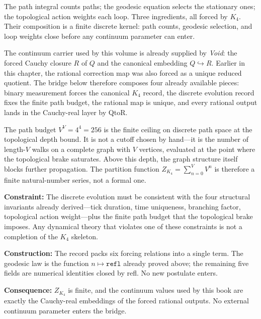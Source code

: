 \documentclass[11pt,a4paper]{book}
\def\mathbb#1{#1}%
\def\texttt#1{#1}%
\def\ensuremath#1{#1}%
\begin{document}
The path integral counts paths; the geodesic equation selects the stationary ones; the topological action weights each loop. Three ingredients, all forced by $K_4$. Their composition is a finite discrete kernel: path counts, geodesic selection, and loop weights close before any continuum parameter can enter.

The continuum carrier used by this volume is already supplied by \textit{Void}: the forced Cauchy closure $\mathbb{R}$ of $\mathbb{Q}$ and the canonical embedding $\mathbb{Q} \hookrightarrow \mathbb{R}$. Earlier in this chapter, the rational correction map was also forced as a unique reduced quotient. The bridge below therefore composes four already available pieces: binary measurement forces the canonical $K_4$ record, the discrete evolution record fixes the finite path budget, the rational map is unique, and every rational output lands in the Cauchy-real layer by \texttt{\ensuremath{\mathbb{Q}}to\ensuremath{\mathbb{R}}}.

The path budget $V^V = 4^4 = 256$ is the finite ceiling on discrete path space at the topological depth bound. It is not a cutoff chosen by hand---it is the number of length-$V$ walks on a complete graph with $V$ vertices, evaluated at the point where the topological brake saturates. Above this depth, the graph structure itself blocks further propagation. The partition function $Z_{K_4} = \sum_{n=0}^{V} V^n$ is therefore a finite natural-number series, not a formal one.

\textbf{Constraint:} The discrete evolution must be consistent with the four structural invariants already derived---tick duration, time uniqueness, branching factor, topological action weight---plus the finite path budget that the topological brake imposes. Any dynamical theory that violates one of these constraints is not a completion of the $K_4$ skeleton.

\textbf{Construction:} The record packs six forcing relations into a single term. The geodesic law is the function $n \mapsto \mathtt{refl}$ already proved above; the remaining five fields are numerical identities closed by \texttt{refl}. No new postulate enters.

\textbf{Consequence:} $Z_{K_4}$ is finite, and the continuum values used by this book are exactly the Cauchy-real embeddings of the forced rational outputs. No external continuum parameter enters the bridge.
\end{document}
